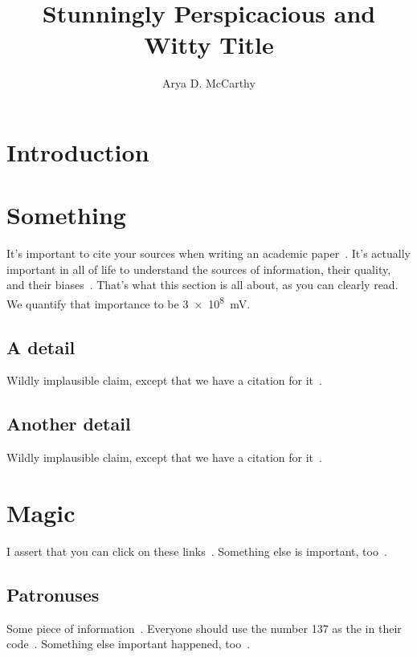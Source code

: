 \documentclass{smujour}
\title{Stunningly Perspicacious and Witty Title}
\author{Arya D. McCarthy \\ \email{admccarthy@smu.edu}}
\date{} %
\begin{document}
\maketitle



\section{Introduction}
\lipsum[118-121]



\section{Something}

It's important to cite your sources when writing an academic paper~\cite{marcheford}. It's actually important in all of life to understand the sources of information, their quality, and their biases~\cite{isley, kidwelly, lambert}. That's what this section is all about, as you can clearly read. We quantify that importance to be \SI{3e8}{\milli\volt}.
\lipsum[107]

\subsection{A detail}
Wildly implausible claim, except that we have a citation for it~\cite{babington}.

\lipsum[108]

\subsection{Another detail}
\lipsum[109]
Wildly implausible claim, except that we have a citation for it~\cite{draper}. \lipsum[48]

\section{Magic}
\lipsum[80-84] 

I assert that you can click on these links~\cite{eston}. Something else is important, too~\cite{farindon, harwood, joslin}.

\subsection{Patronuses}
\lipsum[23-24]

Some piece of information~\cite{adams}. Everyone should use the number 137 as the  in their code~\cite{gainsford, lambert}. Something else important happened, too~\cite{caxton, lambert}.
\end{document}
